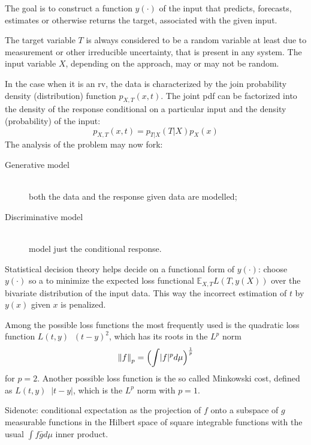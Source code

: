 \documentclass[a4paper]{article}
\newcommand{\abs}[1]{{\left | #1 \right |}}
\newcommand{\nrm}[1]{{\left\| #1 \right \|}}
\newcommand{\ex}{\mathbb{E}}
\newcommand{\defn}{\mathop{\overset{\Delta}{=}}\nolimits}
\begin{document}
The goal is to construct a function $y(\cdot)$ of the input that predicts, forecasts,
estimates or otherwise returns the target, associated with the given input.

The target variable $T$ is always considered to be a random variable at least due
to measurement or other irreducible uncertainty, that is present in any system.
The input variable $X$, depending on the approach, may or may not be random.

In the case when it is an rv, the data is characterized by the join probability
density (distribution) function $p_{X,T}(x,t)$.
The joint pdf can be factorized into the density of the response conditional on
a particular input and the density (probability) of the input:
\[p_{X,T}(x,t) = p_{T\rvert X}(T\rvert X) p_X(x) \]
The analysis of the problem may now fork:
\begin{description}
	\item[Generative model] \hfill \\
		both the data and the response given data are modelled;
	\item[Discriminative model] \hfill \\
		model just the conditional response.
\end{description}

Statistical decision theory helps decide on a functional form of $y(\cdot)$:
choose $y(\cdot)$ so a to minimize the expected loss functional $\ex_{X,T} L(T,y(X))$
over the bivariate distribution of the input data.
This way the incorrect estimation of $t$ by $y(x)$ given $x$ is penalized.

Among the possible loss functions the most frequently used is the quadratic
loss function $L(t,y) \defn (t-y)^2$, which has its roots in the $L^p$ norm
\[\nrm{f}_p = \Bigl(\int \lvert f\rvert^p d\mu\Bigr)^\frac{1}{p}\]
for $p = 2$. Another possible loss function is the so called Minkowski cost,
defined as $L(t,y) \defn \abs{t-y}$, which is the $L^p$ norm with $p=1$.

Sidenote: conditional expectation as the projection of $f$ onto a subspace of $g$
measurable functions in the Hilbert space of square integrable functions with the
usual $\int f\bar{g} d\mu$ inner product.

\end{document}
